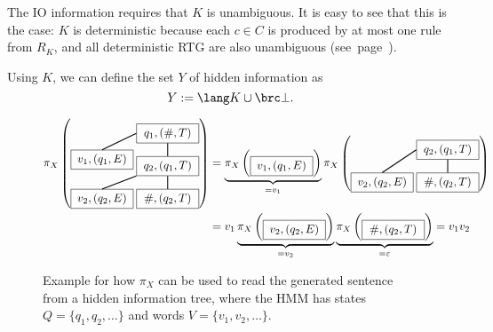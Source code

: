 The IO information requires that $K$ is unambiguous. It is easy to see that
this is the case: $K$ is deterministic because each $c\in C$ is produced by at
most one rule from $R_K$, and all deterministic RTG are also unambiguous
(see~page~\pageref{lemma:02-deterministic-is-unambiguous}).

Using $K$, we can define the set $Y$ of hidden information as
\[
 Y := \lang K \cup \brc\bot.
\]

\begin{figure}[t!]
 \begin{align*}
  \pi_X\left(\begin{tikzpicture}[every node/.style={rectangle,draw,minimum width=1.9cm},baseline=(current bounding box.center)]
   \node (t0) at (0,0) { $q_1,(\#,T)$ };
   \node (t1) at (0,-1) { $q_2,(q_1,T)$ } edge[thick] (t0);
   \node (t2) at (0,-2) { $\#,(q_2,T)$ } edge[thick] (t1);
   \node (e1) at (-2,-0.8) { $v_1,(q_1,E)$ }; \draw [thick] (t0.west) -- (e1.north);
   \node (e2) at (-2,-2) { $v_2,(q_2,E)$ }; \draw [thick] (t1.south west) -- (e2.north);
  \end{tikzpicture}\right)
  &=
   \underbrace{\pi_X\left(\begin{tikzpicture}[every node/.style={rectangle,draw,minimum width=1.9cm},baseline=(current bounding box.center)]
    \node (e1) at (0,0) { $v_1,(q_1,E)$ };
   \end{tikzpicture}\right)}_{=v_1}
   \pi_X\left(\begin{tikzpicture}[every node/.style={rectangle,draw,minimum width=1.9cm},baseline=(current bounding box.center)]
    \node (t1) at (0,0) { $q_2,(q_1,T)$ };
    \node (t2) at (0,-1) { $\#,(q_2,T)$ } edge[thick] (t1);
    \node (e2) at (-2,-1) { $v_2,(q_2,E)$ }; \draw [thick] (t1.west) -- (e2.north);
   \end{tikzpicture}\right)
  \\
  &= v_1
   \underbrace{\pi_X\left(\begin{tikzpicture}[every node/.style={rectangle,draw,minimum width=1.9cm},baseline=(current bounding box.center)]
    \node (e2) at (0,0) { $v_2,(q_2,E)$ };
   \end{tikzpicture}\right)}_{=v_2}
   \underbrace{\pi_X\left(\begin{tikzpicture}[every node/.style={rectangle,draw,minimum width=1.9cm},baseline=(current bounding box.center)]
    \node (t2) at (0,0) { $\#,(q_2,T)$ };
   \end{tikzpicture}\right)}_{=\eps}
   = v_1v_2
 \end{align*}
 \caption{\label{fig:03-readoff}%
  Example for how $\pi_X$ can be used to read the generated sentence from a hidden information tree, where the HMM has states $Q = \{q_1,q_2,\ldots\}$ and words $V = \{v_1,v_2,\ldots\}$.
 }
\end{figure}

